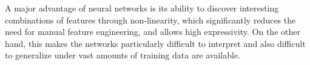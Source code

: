 A major advantage of neural networks is its ability to discover interesting combinations of features through non-linearity, which significantly reduces the need for manual feature engineering, and allows high expressivity. On the other hand, this makes the networks particularly difficult to interpret and also difficult to generalize under vast amounts of training data are available.

%
%
%
%
%

%
%
%

%

%
%
%
%


